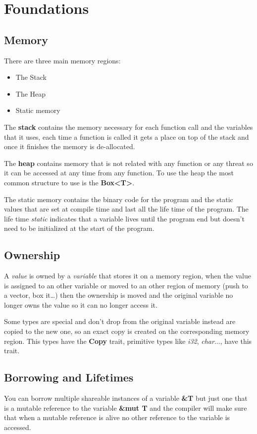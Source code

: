 \section{Foundations}

\subsection{Memory}

There are three main memory regions:

\begin{itemize}
    \item The Stack
    \item The Heap
    \item Static memory
\end{itemize}

The \textbf{stack} contains the memory necessary for each function call and the variables that it uses,
each time a function is called it gets a place on top of the stack and once it finishes the memory is de-allocated.

The \textbf{heap} contains memory that is not related with any function or any threat so it can be accessed at any time from any function.
To use the heap the most common structure to use is the \textbf{Box<T>}.

The static memory contains the binary code for the program and the static values that are set at compile time and last all the life time of the program.
The life time \textit{static} indicates that a variable lives until the program end but doesn’t need to be initialized at the start of the program.

\subsection{Ownership}

A \textit{value} is owned by a \textit{variable} that stores it on a memory region,
when the value is assigned to an other variable or moved to an other region of memory (push to a vector, box it…)
then the ownership is moved and the original variable no longer owns the value so it can no longer access it.

Some types are special and don’t drop from the original variable instead are copied to the new one,
so an exact copy is created on the corresponding memory region.
This types have the \textbf{Copy} trait, primitive types like \textit{i32}, \textit{char}$\dots$, have this trait.

\subsection{Borrowing and Lifetimes}

You can borrow multiple shareable instances of a variable \textbf{\&T} but just one that is a mutable reference to the variable \textbf{\&mut T}
and the compiler will make sure that when a mutable reference is alive no other reference to the variable is accessed.